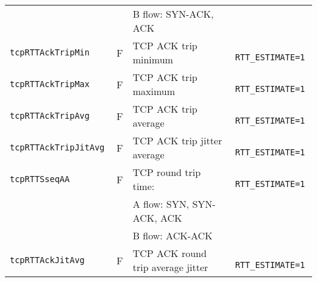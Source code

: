\documentclass[documentation]{subfiles}
\begin{document}
\begin{longtable}{>{\tt}lll>{\tt\small}l}
                                     &            & \qquad B flow: SYN-ACK, ACK                           & \\
    tcpRTTAckTripMin                 & F          & TCP ACK trip minimum                                  & RTT\_ESTIMATE=1\\
    tcpRTTAckTripMax                 & F          & TCP ACK trip maximum                                  & RTT\_ESTIMATE=1\\
    tcpRTTAckTripAvg                 & F          & TCP ACK trip average                                  & RTT\_ESTIMATE=1\\
    tcpRTTAckTripJitAvg              & F          & TCP ACK trip jitter average                           & RTT\_ESTIMATE=1\\
    tcpRTTSseqAA                     & F          & TCP round trip time:                                  & RTT\_ESTIMATE=1\\
                                     &            & \qquad A flow: SYN, SYN-ACK, ACK                      & \\
                                     &            & \qquad B flow: ACK-ACK                                & \\
    tcpRTTAckJitAvg                  & F          & TCP ACK round trip average jitter                     & RTT\_ESTIMATE=1\\
    \bottomrule
\end{longtable}
\end{document}
